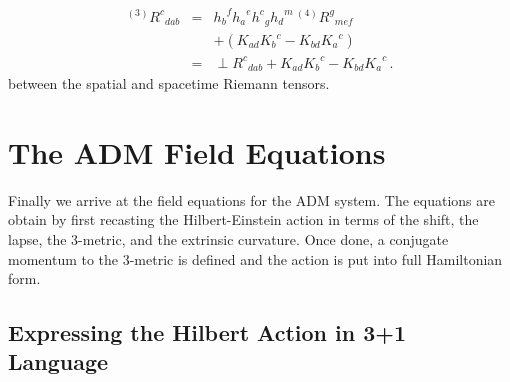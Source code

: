 \begin{eqnarray}\label{eq:gauss}
 {}^{(3)} {R^c}_{dab} & = & {h_b}^f {h_a}^e {h^c}_g {h_d}^m
                            \, {}^{(4)} {R^g}_{mef} \nonumber \\
                      &   &
                            +
                            \left(   K_{ad} {K_b}^c
                                   - K_{bd} {K_a}^c
                            \right) \nonumber \\
                       & = & \perp {R^c}_{dab} + K_{ad}{K_b}^c - K_{bd}{K_a}^{c} \, .
\end{eqnarray}
between the spatial and spacetime Riemann tensors.

\section{The ADM Field Equations}\label{S:ADM_gp}

Finally we arrive at the field equations for the ADM system.  The equations are
obtain by first recasting the Hilbert-Einstein action in terms of the shift, the
lapse, the 3-metric, and the extrinsic curvature.  Once done, a conjugate
momentum to the 3-metric is defined and the action is put into full Hamiltonian
form.

\subsection{Expressing the Hilbert Action in 3+1 Language}\label{SS:Hilbert_A}

